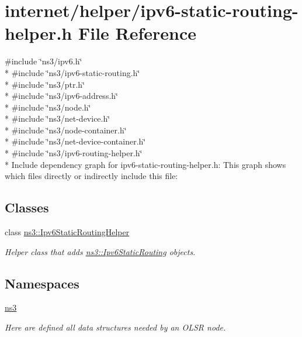 \hypertarget{ipv6-static-routing-helper_8h}{}\section{internet/helper/ipv6-\/static-\/routing-\/helper.h File Reference}
\label{ipv6-static-routing-helper_8h}
{\ttfamily \#include \char`\"{}ns3/ipv6.\+h\char`\"{}}\\*
{\ttfamily \#include \char`\"{}ns3/ipv6-\/static-\/routing.\+h\char`\"{}}\\*
{\ttfamily \#include \char`\"{}ns3/ptr.\+h\char`\"{}}\\*
{\ttfamily \#include \char`\"{}ns3/ipv6-\/address.\+h\char`\"{}}\\*
{\ttfamily \#include \char`\"{}ns3/node.\+h\char`\"{}}\\*
{\ttfamily \#include \char`\"{}ns3/net-\/device.\+h\char`\"{}}\\*
{\ttfamily \#include \char`\"{}ns3/node-\/container.\+h\char`\"{}}\\*
{\ttfamily \#include \char`\"{}ns3/net-\/device-\/container.\+h\char`\"{}}\\*
{\ttfamily \#include \char`\"{}ns3/ipv6-\/routing-\/helper.\+h\char`\"{}}\\*
Include dependency graph for ipv6-\/static-\/routing-\/helper.h\+:
This graph shows which files directly or indirectly include this file\+:
\subsection*{Classes}
\begin{DoxyCompactItemize}
\item 
class \hyperlink{classns3_1_1Ipv6StaticRoutingHelper}{ns3\+::\+Ipv6\+Static\+Routing\+Helper}
\begin{DoxyCompactList}\small\item\em Helper class that adds \hyperlink{classns3_1_1Ipv6StaticRouting}{ns3\+::\+Ipv6\+Static\+Routing} objects. \end{DoxyCompactList}\end{DoxyCompactItemize}
\subsection*{Namespaces}
\begin{DoxyCompactItemize}
\item 
 \hyperlink{namespacens3}{ns3}
\begin{DoxyCompactList}\small\item\em Here are defined all data structures needed by an O\+L\+SR node. \end{DoxyCompactList}\end{DoxyCompactItemize}
